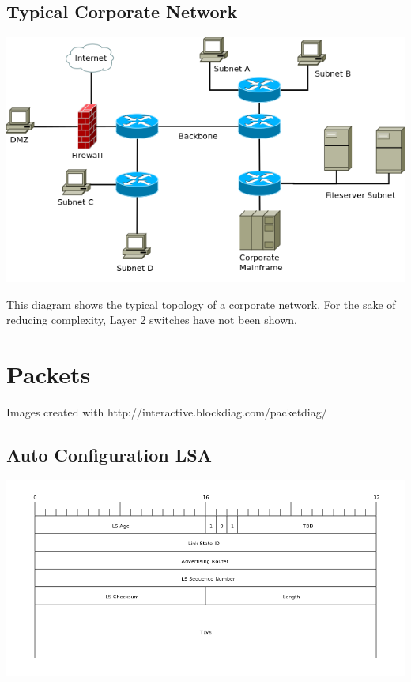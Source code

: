\begin{landscape}
\chapter{Typical Corporate Network}
\label{typical_corporate_net}
\begin{center}
	\includegraphics[width=0.75\linewidth]{../Diagrams/Network/CorporateNetwork.png}
\end{center}
This diagram shows the typical topology of a corporate network. For the sake of reducing complexity, Layer 2 switches have not been shown.

\end{landscape}

\chapter{Packets}
Images created with http://interactive.blockdiag.com/packetdiag/

\section{Auto Configuration LSA}
\label{AC-LSA}
\begin{center}
	\includegraphics[width=\linewidth]{../Diagrams/Packets/ac_lsa.png}
\end{center}

